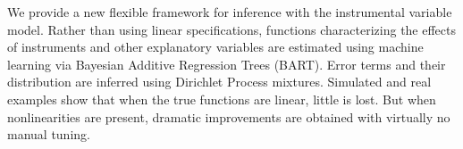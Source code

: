 
We provide a new flexible framework for inference with the
instrumental variable model.  Rather than using linear specifications,
functions characterizing the effects of instruments and other
explanatory variables are estimated using machine learning via
Bayesian Additive Regression Trees (BART).  Error terms and their
distribution are inferred using Dirichlet Process mixtures.  Simulated
and real examples show that when the true functions are linear, little
is lost.  But when nonlinearities are present, dramatic improvements
are obtained with virtually no manual tuning.
